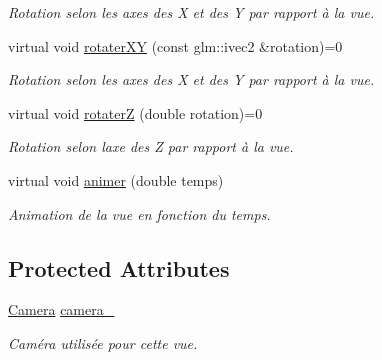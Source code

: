 \begin{DoxyCompactItemize}
\begin{DoxyCompactList}\small\item\em Rotation selon les axes des X et des Y par rapport à la vue. \end{DoxyCompactList}\item 
\hypertarget{classvue_1_1_vue_a39c80e5438dfe09f70baded5b1442b9a}{}virtual void \hyperlink{classvue_1_1_vue_a39c80e5438dfe09f70baded5b1442b9a}{rotater\+X\+Y} (const glm\+::ivec2 \&rotation)=0\label{classvue_1_1_vue_a39c80e5438dfe09f70baded5b1442b9a}

\begin{DoxyCompactList}\small\item\em Rotation selon les axes des X et des Y par rapport à la vue. \end{DoxyCompactList}\item 
\hypertarget{classvue_1_1_vue_a0b06a4b099a3bb953a672d84295556d9}{}virtual void \hyperlink{classvue_1_1_vue_a0b06a4b099a3bb953a672d84295556d9}{rotater\+Z} (double rotation)=0\label{classvue_1_1_vue_a0b06a4b099a3bb953a672d84295556d9}

\begin{DoxyCompactList}\small\item\em Rotation selon l\textquotesingle{}axe des Z par rapport à la vue. \end{DoxyCompactList}\item 
virtual void \hyperlink{classvue_1_1_vue_ab6435f4fa09e00dd2f96af3ff45dc60a}{animer} (double temps)
\begin{DoxyCompactList}\small\item\em Animation de la vue en fonction du temps. \end{DoxyCompactList}\end{DoxyCompactItemize}
\subsection*{Protected Attributes}
\begin{DoxyCompactItemize}
\item 
\hypertarget{classvue_1_1_vue_a9b2dabe1d684a33032343dfff03b929d}{}\hyperlink{classvue_1_1_camera}{Camera} \hyperlink{classvue_1_1_vue_a9b2dabe1d684a33032343dfff03b929d}{camera\+\_\+}\label{classvue_1_1_vue_a9b2dabe1d684a33032343dfff03b929d}

\begin{DoxyCompactList}\small\item\em Caméra utilisée pour cette vue. \end{DoxyCompactList}\end{DoxyCompactItemize}


